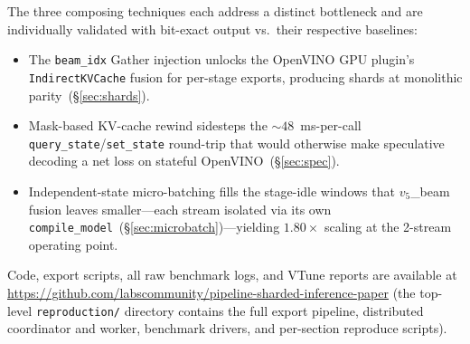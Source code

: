 \documentclass[11pt]{article}
\newcommand{\brk}{\discretionary{}{}{}}
\begin{document}
The three composing techniques each address a distinct bottleneck and are individually validated with bit-exact output vs.\ their respective baselines:

\begin{itemize}[leftmargin=*]
\item The \texttt{beam\_idx} Gather injection unlocks the OpenVINO GPU plugin's \texttt{Indirect\brk KVCache} fusion for per-stage exports, producing shards at monolithic parity~(\S\ref{sec:shards}).
\item Mask-based KV-cache rewind sidesteps the $\sim 48$~ms-per-call \texttt{query\_state}/\texttt{set\_state} round-trip that would otherwise make speculative decoding a net loss on stateful OpenVINO~(\S\ref{sec:spec}).
\item Independent-state micro-batching fills the stage-idle windows that $v_5$\_beam fusion leaves smaller---each stream isolated via its own \texttt{compile\_\brk model}~(\S\ref{sec:microbatch})---yielding $1.80\times$ scaling at the 2-stream operating point.
\end{itemize}

Code, export scripts, all raw benchmark logs, and VTune reports are available at \url{https://github.com/labscommunity/pipeline-sharded-inference-paper} (the top-level \texttt{reproduction/} directory contains the full export pipeline, distributed coordinator and worker, benchmark drivers, and per-section reproduce scripts).



\end{document}
